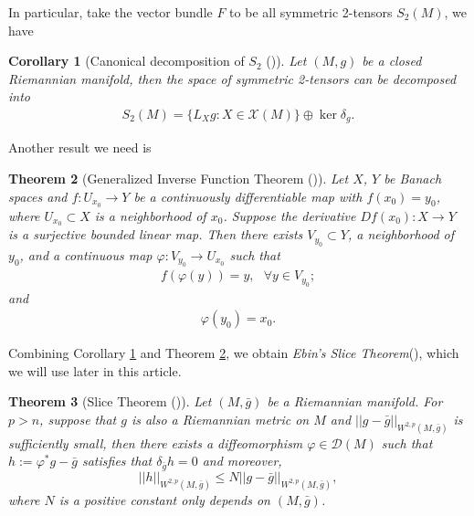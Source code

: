 \documentclass[12pt]{amsart}
\newtheorem{theorem}{Theorem}[section]
\newtheorem{corollary}[theorem]{Corollary}
\theoremstyle{definition}
\theoremstyle{remark}
\numberwithin{equation}{section}
\begin{document}
In particular, take the vector bundle $F$ to be all symmetric 2-tensors $S_2(M)$, we have

\begin{corollary}[Canonical decomposition of $S_2$ (\cite{B-E, F-M})]\label{Canonical_decomposition_S_2}
Let $(M,g)$ be a closed Riemannian manifold, then the space of symmetric 2-tensors can be decomposed into
\begin{align}
S_2(M) = \{ L_X g : X \in \mathscr{X}(M)\} \oplus \ker \delta_g.
\end{align}
\end{corollary}

Another result we need is

\begin{theorem}[Generalized Inverse Function Theorem (\cite{Gel'man})]\label{Generalized_Inverse_Function_Theorem}
Let $X$, $Y$ be Banach spaces and $f : U_{x_0} \rightarrow Y$ be a continuously differentiable map with $f(x_0) = y_0$, where $U_{x_0} \subset X$ is a neighborhood of $x_0$. Suppose the derivative $D f (x_0) : X \rightarrow Y$ is a surjective bounded linear map. Then there exists $V_{y_0} \subset Y$, a neighborhood of $y_0$, and a continuous map $\varphi : V_{y_0} \rightarrow U_{x_0}$ such that
\begin{align*}
f(\varphi(y)) = y, \ \ \ \forall y\in V_{y_0};
\end{align*}
and
\begin{align*}
\varphi(y_0) = x_0.
\end{align*}

\end{theorem}

Combining Corollary \ref{Canonical_decomposition_S_2} and Theorem \ref{Generalized_Inverse_Function_Theorem}, we obtain \emph{Ebin's Slice Theorem}(\cite{Ebin}), which we will use later in this article.

\begin{theorem}[Slice Theorem (\cite{Ebin, F-M})]\label{Slice_Theorem}
Let $(M,\bar{g})$ be a Riemannian manifold. For $p> n$, suppose that $g$ is also a Riemannian metric on $M$ and $||g - \bar{g}||_{W^{2,p}(M,\bar{g})}$ is sufficiently small, then there exists a diffeomorphism $\varphi \in \mathscr{D} (M)$ such that $h := \varphi^* g - \bar{g}$ satisfies that $\delta_{\bar{g}} h = 0$ and moreover,
$$||h||_{W^{2,p}(M,\bar{g})} \leq N ||g - \bar{g}||_{W^{2,p}(M,\bar{g})},$$
where $N$ is a positive constant only depends on $(M, \bar g)$.
\end{theorem}
\end{document}
